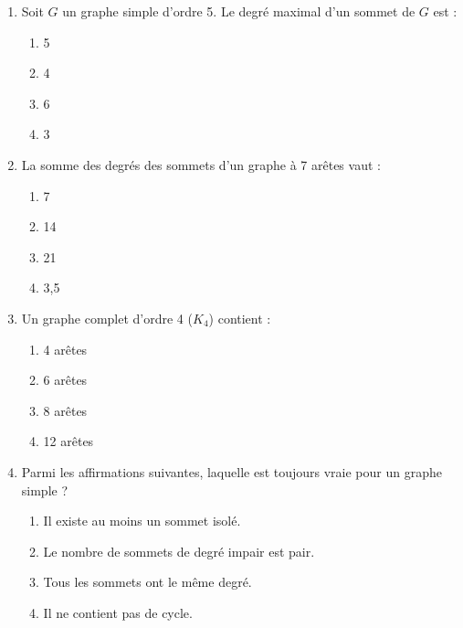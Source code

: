 \documentclass[11pt]{article}
\begin{document}
\begin{exercice}
\begin{enumerate}
    \item Soit $G$ un graphe simple d'ordre 5. Le degré maximal d'un sommet de $G$ est :
    \begin{enumerate}
        \item 5 \item 4 \item 6 \item 3
    \end{enumerate}
    \item La somme des degrés des sommets d'un graphe à 7 arêtes vaut :
    \begin{enumerate}
        \item 7 \item 14 \item 21 \item 3,5
    \end{enumerate}
    \item Un graphe complet d'ordre 4 ($K_4$) contient :
    \begin{enumerate}
        \item 4 arêtes \item 6 arêtes \item 8 arêtes \item 12 arêtes
    \end{enumerate}
    \item Parmi les affirmations suivantes, laquelle est toujours vraie pour un graphe simple ?
    \begin{enumerate}
        \item Il existe au moins un sommet isolé.
        \item Le nombre de sommets de degré impair est pair.
        \item Tous les sommets ont le même degré.
        \item Il ne contient pas de cycle.
    \end{enumerate}
\end{enumerate}
\end{exercice}
\end{document}
